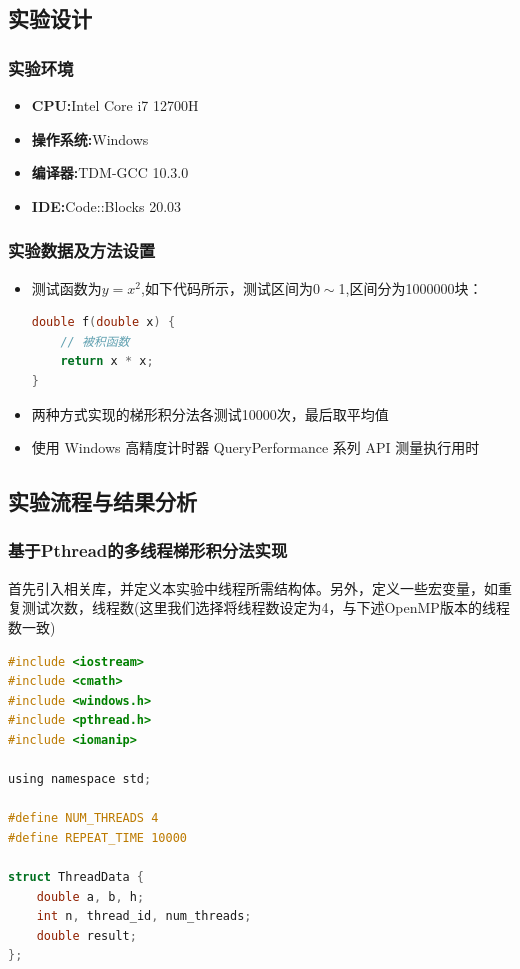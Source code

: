 \documentclass{nku}
\begin{document}
\subsection{实验设计}
\subsubsection{实验环境}
\begin{itemize}
    \item \textbf{CPU:}Intel Core i7 12700H
    \item \textbf{操作系统:}Windows
    \item \textbf{编译器:}TDM-GCC 10.3.0
    \item \textbf{IDE:}Code::Blocks 20.03
\end{itemize}

\subsubsection{实验数据及方法设置}
\begin{itemize}
    \item 测试函数为$y=x^2$,如下代码所示，测试区间为$0\sim$1,区间分为1000000块：
\begin{lstlisting}[language=C]
double f(double x) {
    // 被积函数
    return x * x;
}
\end{lstlisting}
    \item 两种方式实现的梯形积分法各测试10000次，最后取平均值
    \item 使用 Windows 高精度计时器 QueryPerformance 系列 API 测量执行用时
\end{itemize}


\subsection{实验流程与结果分析}
\subsubsection{基于Pthread的多线程梯形积分法实现}
首先引入相关库，并定义本实验中线程所需结构体。另外，定义一些宏变量，如重复测试次数，线程数(这里我们选择将线程数设定为4，与下述OpenMP版本的线程数一致)
\begin{lstlisting}[language=C]
#include <iostream>
#include <cmath>
#include <windows.h>
#include <pthread.h>
#include <iomanip>

using namespace std;

#define NUM_THREADS 4
#define REPEAT_TIME 10000

struct ThreadData {
    double a, b, h;
    int n, thread_id, num_threads;
    double result;
};
\end{lstlisting}
\end{document}
